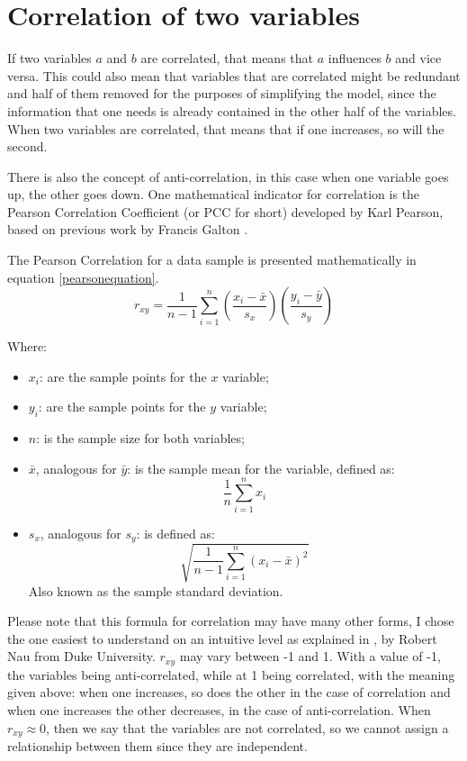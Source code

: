 \documentclass[12pt,a4paper,titlepage]{report}
\begin{document}
\section{Correlation of two variables}

If two variables $ a $ and $ b $ are correlated, that means that $ a $ influences $ b $ and vice versa. This could also mean that variables that are correlated might be redundant and half of them removed for the purposes of simplifying the model, since the information that one needs is already contained in the other half of the variables. When two variables are correlated, that means that if one increases, so will the second.

There is also the concept of anti-correlation, in this case when one variable goes up, the other goes down. One mathematical indicator for correlation is the Pearson Correlation Coefficient (or PCC for short) \cite{pearson1895note} developed by Karl Pearson, based on previous work by Francis Galton \cite{stiglercorrelationgalton}.

The Pearson Correlation for a data sample is presented mathematically in equation \ref{pearsonequation}.
\begin{equation}
r_{xy} = \frac{1}{n-1}\sum_{i=1}^{n}\left(\frac{x_{i}-\bar{x}}{s_{x}}\right)\left(\frac{y_{i}-\bar{y}}{s_{y}}\right)
\label{pearsonequation}
\end{equation}

Where:
\begin{itemize}
    \item $ x_{i} $: are the sample points for the $ x $ variable;
    \item $ y_{i} $: are the sample points for the $ y $ variable;
    \item $ n $: is the sample size for both variables;
    \item $ \bar{x} $, analogous for $ \bar{y} $: is the sample mean for the variable, defined as:
\begin{equation}
    \frac{1}{n}\sum_{i=1}^{n}x_{i}
\end{equation}
    \item $ s_{x} $, analogous for $ s_{y} $: is defined as: 
\begin{equation}
    \sqrt{\frac{1}{n-1}\sum_{i=1}^{n}(x_{i}-\bar{x})^2}
\end{equation}
    Also known as the sample standard deviation.
\end{itemize}
Please note that this formula for correlation may have many other forms, I chose the one easiest to understand on an intuitive level as explained in \cite{nauregression}, by Robert Nau from Duke University. 
$ r_{xy} $ may vary between -1 and 1. With a value of -1, the variables being anti-correlated, while at 1 being correlated, with the meaning given above: when one increases, so does the other in the case of correlation and when one increases the other decreases, in the case of anti-correlation. When $ r_{xy} \approx 0 $, then we say that the variables are not correlated, so we cannot assign a relationship between them since they are independent.
\end{document}
